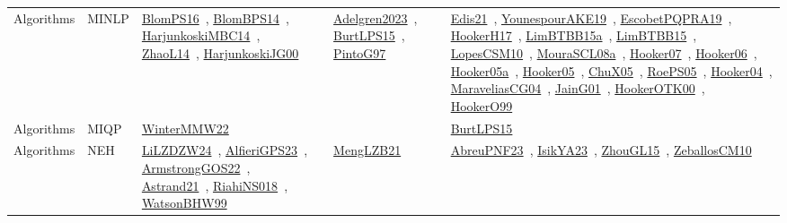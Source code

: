 {\begin{longtable}{lp{3cm}>{\raggedright\arraybackslash}p{6cm}>{\raggedright\arraybackslash}p{6cm}>{\raggedright\arraybackslash}p{8cm}}
\index{MINLP}\index{Algorithms!MINLP}Algorithms & MINLP & \href{../works/BlomPS16.pdf}{BlomPS16}~\cite{BlomPS16}, \href{../works/BlomBPS14.pdf}{BlomBPS14}~\cite{BlomBPS14}, \href{../works/HarjunkoskiMBC14.pdf}{HarjunkoskiMBC14}~\cite{HarjunkoskiMBC14}, \href{../works/ZhaoL14.pdf}{ZhaoL14}~\cite{ZhaoL14}, \href{../works/HarjunkoskiJG00.pdf}{HarjunkoskiJG00}~\cite{HarjunkoskiJG00} & \href{../works/Adelgren2023.pdf}{Adelgren2023}~\cite{Adelgren2023}, \href{../works/BurtLPS15.pdf}{BurtLPS15}~\cite{BurtLPS15}, \href{../works/PintoG97.pdf}{PintoG97}~\cite{PintoG97} & \href{../works/Edis21.pdf}{Edis21}~\cite{Edis21}, \href{../works/YounespourAKE19.pdf}{YounespourAKE19}~\cite{YounespourAKE19}, \href{../works/EscobetPQPRA19.pdf}{EscobetPQPRA19}~\cite{EscobetPQPRA19}, \href{../works/HookerH17.pdf}{HookerH17}~\cite{HookerH17}, \href{../works/LimBTBB15a.pdf}{LimBTBB15a}~\cite{LimBTBB15a}, \href{../works/LimBTBB15.pdf}{LimBTBB15}~\cite{LimBTBB15}, \href{../works/LopesCSM10.pdf}{LopesCSM10}~\cite{LopesCSM10}, \href{../works/MouraSCL08a.pdf}{MouraSCL08a}~\cite{MouraSCL08a}, \href{../works/Hooker07.pdf}{Hooker07}~\cite{Hooker07}, \href{../works/Hooker06.pdf}{Hooker06}~\cite{Hooker06}, \href{../works/Hooker05a.pdf}{Hooker05a}~\cite{Hooker05a}, \href{../works/Hooker05.pdf}{Hooker05}~\cite{Hooker05}, \href{../works/ChuX05.pdf}{ChuX05}~\cite{ChuX05}, \href{../works/RoePS05.pdf}{RoePS05}~\cite{RoePS05}, \href{../works/Hooker04.pdf}{Hooker04}~\cite{Hooker04}, \href{../works/MaraveliasCG04.pdf}{MaraveliasCG04}~\cite{MaraveliasCG04}, \href{../works/JainG01.pdf}{JainG01}~\cite{JainG01}, \href{../works/HookerOTK00.pdf}{HookerOTK00}~\cite{HookerOTK00}, \href{../works/HookerO99.pdf}{HookerO99}~\cite{HookerO99}\\
\index{MIQP}\index{Algorithms!MIQP}Algorithms & MIQP & \href{../works/WinterMMW22.pdf}{WinterMMW22}~\cite{WinterMMW22} &  & \href{../works/BurtLPS15.pdf}{BurtLPS15}~\cite{BurtLPS15}\\
\index{NEH}\index{Algorithms!NEH}Algorithms & NEH & \href{../works/LiLZDZW24.pdf}{LiLZDZW24}~\cite{LiLZDZW24}, \href{../works/AlfieriGPS23.pdf}{AlfieriGPS23}~\cite{AlfieriGPS23}, \href{../works/ArmstrongGOS22.pdf}{ArmstrongGOS22}~\cite{ArmstrongGOS22}, \href{../works/Astrand21.pdf}{Astrand21}~\cite{Astrand21}, \href{../works/RiahiNS018.pdf}{RiahiNS018}~\cite{RiahiNS018}, \href{../works/WatsonBHW99.pdf}{WatsonBHW99}~\cite{WatsonBHW99} & \href{../works/MengLZB21.pdf}{MengLZB21}~\cite{MengLZB21} & \href{../works/AbreuPNF23.pdf}{AbreuPNF23}~\cite{AbreuPNF23}, \href{../works/IsikYA23.pdf}{IsikYA23}~\cite{IsikYA23}, \href{../works/ZhouGL15.pdf}{ZhouGL15}~\cite{ZhouGL15}, \href{../works/ZeballosCM10.pdf}{ZeballosCM10}~\cite{ZeballosCM10}\\

\end{longtable}}
